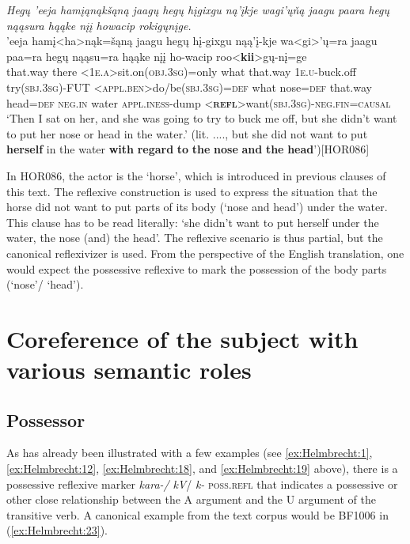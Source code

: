 \documentclass[output=paper]{langscibook}
\begin{document}
\ea \label{ex:Helmbrecht:22}  
   \textit{  Hegų 'eeja hamįąnąkšąną jaagų hegų hįgixgu ną'įkje wagi'ųňą jaagu paara hegų   nąąsura hąąke   nįį howacip rokigųnįge. }\\
   {'eeja}  {hamį<ha>nąk=šąną}   {jaagu} {hegų}  {hį-gixgu}   {nąą'į-kje}  {wa<gi>'ų=ra} {jaagu}  {paa=ra}  {hegų} {nąąsu=ra}  {hąąke}   {nįį}   {ho-wacip} {roo<\textbf{kii}>gų-nį=ge}\\
  {that.way} {there} {<\textsc{1e.a}>sit.on(\textsc{obj.3sg})=only} {what}  {that.way}  {\textsc{1e.u}-buck.off}  {try(\textsc{sbj.3sg})-\textsc{FUT}}  {<\textsc{appl.ben}>do/be(\textsc{sbj.3sg})=\textsc{def}} {what}   {nose=\textsc{def}} {that.way} {head=\textsc{def}}   {\textsc{neg.in}} {water} {\textsc{appl.iness}-dump} {<\textbf{\textsc{\textsc{refl}}}>want(\textsc{sbj.3sg})-\textsc{neg.fin=causal}}\\
 \glt `Then I sat on her, and she was going to try to buck me off, but she didn't want to put   her nose or head in the water.' (lit. ...., but she did not want to put \textbf{herself} in the water   \textbf{with} \textbf{regard} \textbf{to} \textbf{the} \textbf{nose} \textbf{and} \textbf{the} \textbf{head}{}')[HOR086]
\z 

In HOR086, the actor is the `horse', which is introduced in previous clauses of this text. The reflexive construction is used to express the situation that the horse did not want to put parts of its body (`nose and head') under the water. This clause has to be read literally: `she didn't want to put herself under the water, the nose (and) the head'. The reflexive scenario is thus partial, but the canonical reflexivizer is used. From the perspective of the English translation, one would expect the possessive reflexive to mark the possession of the body parts (`nose'/ `head'). 

\section{Coreference of the subject with various semantic roles}\label{sec:Helmbrecht:5}

\subsection{Possessor}\label{sec:Helmbrecht:5.1}
As has already been illustrated with a few examples (see \ref{ex:Helmbrecht:1}, \ref{ex:Helmbrecht:12}, \ref{ex:Helmbrecht:18}, and \ref{ex:Helmbrecht:19} above), there is a possessive reflexive marker \textit{kara-/} \textit{kV}/ \textit{k-} \textsc{poss}.\textsc{refl} that indicates a possessive or other close relationship between the A argument and the U argument of the transitive verb. A canonical example from the text corpus would be BF1006 in (\ref{ex:Helmbrecht:23}).
\end{document}
